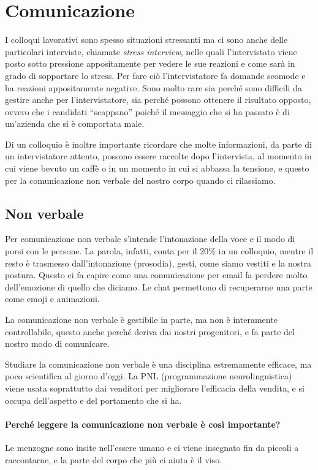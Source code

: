\section{Comunicazione}
I colloqui lavorativi sono spesso situazioni stressanti ma ci sono anche delle
particolari interviste, chiamate \emph{stress interview}, nelle quali
l'intervistato viene posto sotto pressione appositamente per vedere le sue
reazioni e come sarà in grado di sopportare lo stress. Per fare ciò
l'intervistatore fa domande scomode e ha reazioni appositamente negative. Sono
molto rare sia perché sono difficili da gestire anche per l'intervistatore, sia
perché possono ottenere il risultato opposto, ovvero che i candidati
``scappano'' poiché il messaggio che si ha passato è di un'azienda che si è
comportata male.

Di un colloquio è inoltre importante ricordare che molte informazioni, da parte
di un intervistatore attento, possono essere raccolte dopo l'intervista, al
momento in cui viene bevuto un caffè o in un momento in cui si abbassa la
tensione, e questo per la comunicazione non verbale del nostro corpo quando ci
rilassiamo.

\subsection{Non verbale}

Per comunicazione non verbale s'intende l'intonazione della voce e il modo di
porsi con le persone. La parola, infatti, conta per il 20\% in un colloquio,
mentre il resto è trasmesso dall'intonazione (prosodia), gesti, come siamo
vestiti e la nostra postura. Questo ci fa capire come una comunicazione per
email fa perdere molto dell'emozione di quello che diciamo. Le chat permettono
di recuperarne una parte come emoji e animazioni.

La comunicazione non verbale è gestibile in parte, ma non è interamente
controllabile, questo anche perché deriva dai nostri progenitori, e fa parte
del nostro modo di comunicare.

Studiare la comunicazione non verbale è una disciplina estremamente efficace,
ma poco scientifica al giorno d'oggi. La PNL (programmazione neurolinguistica)
viene usata soprattutto dai venditori per migliorare l'efficacia della vendita,
e si occupa dell'aspetto e del portamento che si ha.

\paragraph*{Perché leggere la comunicazione non verbale è così importante?} Le
menzogne sono insite nell'essere umano e ci viene insegnato fin da piccoli a
raccontarne, e la parte del corpo che più ci aiuta è il viso.\\[0.3cm]

